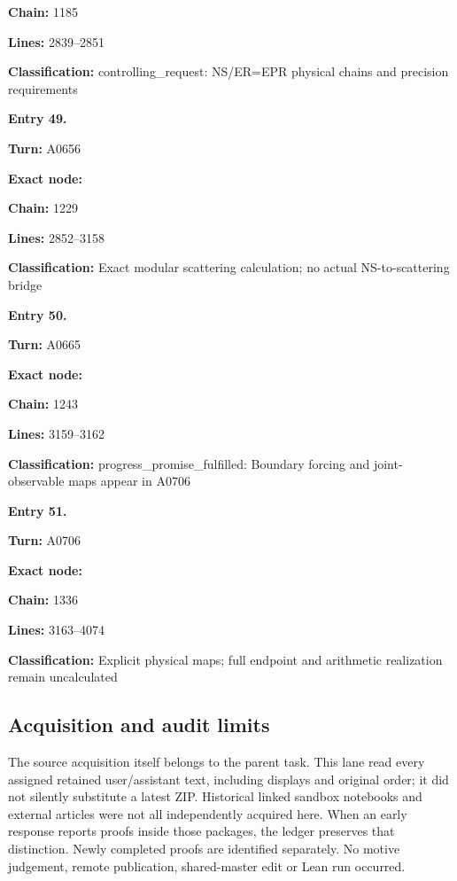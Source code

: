 \textbf{Chain:} 1185

\textbf{Lines:} 2839--2851

\textbf{Classification:} controlling\_request: NS/ER=EPR physical chains
and precision requirements


\textbf{Entry 49.}

\textbf{Turn:} A0656

\textbf{Exact node:} \protect{}

\textbf{Chain:} 1229

\textbf{Lines:} 2852--3158

\textbf{Classification:}
\protect{} Exact modular
scattering calculation; no actual NS-to-scattering bridge


\textbf{Entry 50.}

\textbf{Turn:} A0665

\textbf{Exact node:} \protect{}

\textbf{Chain:} 1243

\textbf{Lines:} 3159--3162

\textbf{Classification:} progress\_promise\_fulfilled: Boundary forcing
and joint-observable maps appear in A0706


\textbf{Entry 51.}

\textbf{Turn:} A0706

\textbf{Exact node:} \protect{}

\textbf{Chain:} 1336

\textbf{Lines:} 3163--4074

\textbf{Classification:}
\protect{} Explicit
physical maps; full endpoint and arithmetic realization remain
uncalculated

\subsection{Acquisition and audit
limits}\label{TranscriptLedgerStage:acquisition-and-audit-limits}

The source acquisition itself belongs to the parent task. This lane read
every assigned retained user/assistant text, including displays and
original order; it did not silently substitute a latest ZIP. Historical
linked sandbox notebooks and external articles were not all
independently acquired here. When an early response reports proofs
inside those packages, the ledger preserves that distinction. Newly
completed proofs are identified separately. No motive judgement, remote
publication, shared-master edit or Lean run occurred.

